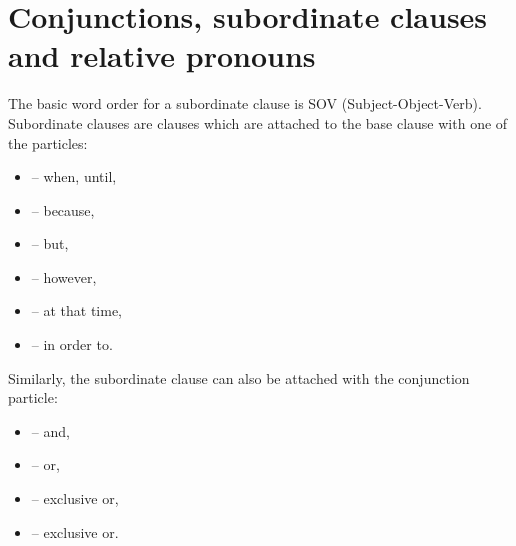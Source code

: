 




\section{Conjunctions, subordinate clauses and relative pronouns}
\label{sec:conjunctions}

The basic word order for a subordinate clause is SOV (Subject-Object-Verb).
Subordinate clauses are clauses which are attached to the base clause with one
of the particles:

\begin{itemize}
    \item {} -- when, until,
    \item {} -- because,
    \item {} -- but,
    \item {} -- however,
    \item {} -- at that time,
    \item {} -- in order to.
\end{itemize}

Similarly, the subordinate clause can also be attached with the conjunction
particle:

\begin{itemize}
    \item {} -- and,
    \item {} -- or,
    \item {} -- exclusive or,
    \item {} -- exclusive or.
\end{itemize}

